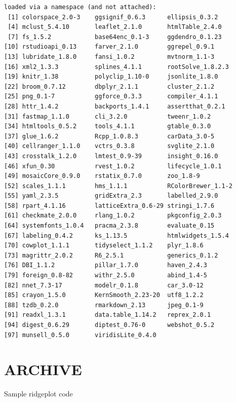 \documentclass[
  letterpaper,
  DIV=11,
  numbers=noendperiod]{scrreprt}
\begin{document}
\begin{verbatim}
loaded via a namespace (and not attached):
 [1] colorspace_2.0-3    ggsignif_0.6.3      ellipsis_0.3.2     
 [4] mclust_5.4.10       leaflet_2.1.0       htmlTable_2.4.0    
 [7] fs_1.5.2            base64enc_0.1-3     ggdendro_0.1.23    
[10] rstudioapi_0.13     farver_2.1.0        ggrepel_0.9.1      
[13] lubridate_1.8.0     fansi_1.0.2         mvtnorm_1.1-3      
[16] xml2_1.3.3          splines_4.1.1       rootSolve_1.8.2.3  
[19] knitr_1.38          polyclip_1.10-0     jsonlite_1.8.0     
[22] broom_0.7.12        dbplyr_2.1.1        cluster_2.1.2      
[25] png_0.1-7           ggforce_0.3.3       compiler_4.1.1     
[28] httr_1.4.2          backports_1.4.1     assertthat_0.2.1   
[31] fastmap_1.1.0       cli_3.2.0           tweenr_1.0.2       
[34] htmltools_0.5.2     tools_4.1.1         gtable_0.3.0       
[37] glue_1.6.2          Rcpp_1.0.8.3        carData_3.0-5      
[40] cellranger_1.1.0    vctrs_0.3.8         svglite_2.1.0      
[43] crosstalk_1.2.0     lmtest_0.9-39       insight_0.16.0     
[46] xfun_0.30           rvest_1.0.2         lifecycle_1.0.1    
[49] mosaicCore_0.9.0    rstatix_0.7.0       zoo_1.8-9          
[52] scales_1.1.1        hms_1.1.1           RColorBrewer_1.1-2 
[55] yaml_2.3.5          gridExtra_2.3       labelled_2.9.0     
[58] rpart_4.1.16        latticeExtra_0.6-29 stringi_1.7.6      
[61] checkmate_2.0.0     rlang_1.0.2         pkgconfig_2.0.3    
[64] systemfonts_1.0.4   pracma_2.3.8        evaluate_0.15      
[67] labeling_0.4.2      ks_1.13.5           htmlwidgets_1.5.4  
[70] cowplot_1.1.1       tidyselect_1.1.2    plyr_1.8.6         
[73] magrittr_2.0.2      R6_2.5.1            generics_0.1.2     
[76] DBI_1.1.2           pillar_1.7.0        haven_2.4.3        
[79] foreign_0.8-82      withr_2.5.0         abind_1.4-5        
[82] nnet_7.3-17         modelr_0.1.8        car_3.0-12         
[85] crayon_1.5.0        KernSmooth_2.23-20  utf8_1.2.2         
[88] tzdb_0.2.0          rmarkdown_2.13      jpeg_0.1-9         
[91] readxl_1.3.1        data.table_1.14.2   reprex_2.0.1       
[94] digest_0.6.29       diptest_0.76-0      webshot_0.5.2      
[97] munsell_0.5.0       viridisLite_0.4.0  
\end{verbatim}

\hypertarget{archive-1}{%
\section{ARCHIVE}\label{archive-1}}

Sample ridgeplot code
\end{document}
